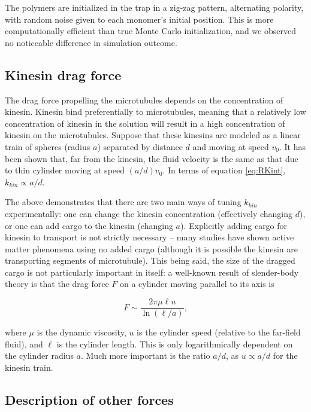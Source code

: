 \documentclass[11pt]{ucthesis}
\begin{document}
The polymers are initialized in the trap in a zig-zag pattern, alternating polarity, with random noise given to each monomer's initial position. This is more computationally efficient than true Monte Carlo initialization, and we observed no noticeable difference in simulation outcome.

\subsection{Kinesin drag force}

The drag force propelling the microtubules depends on the concentration of kinesin. Kinesin bind preferentially to microtubules, meaning that a relatively low concentration of kinesin in the solution will result in a high concentration of kinesin on the microtubules. Suppose that these kinesins are modeled as a linear train of spheres (radius $a$) separated by distance $d$ and moving at speed $v_0$. It has been shown \cite{Monteith2016} that, far from the kinesin, the fluid velocity is the same as that due to thin cylinder moving at speed $(a/d)v_0$. In terms of equation \ref{eq:RKint}, $k_{kin}\propto a/d$.

The above demonstrates that there are two main ways of tuning $k_{kin}$ experimentally: one can change the kinesin concentration (effectively changing $d$), or one can add cargo to the kinesin (changing $a$). Explicitly adding cargo for kinesin to transport is not strictly necessary -- many studies have shown active matter phenomena using no added cargo (although it is possible the kinesin are transporting segments of microtubule). This being said, the size of the dragged cargo is not particularly important in itself: a well-known result of slender-body theory is that the drag force $F$ on a cylinder moving parallel to its axis is

\begin{equation}
F \sim \frac{2\pi \mu \ell u}{\ln(\ell/a)},
\end{equation}

where $\mu$ is the dynamic viscosity, $u$ is the cylinder speed (relative to the far-field fluid), and $\ell$ is the cylinder length. This is only logarithmically dependent on the cylinder radius $a$. Much more important is the ratio $a/d$, as $u\propto a/d$ for the kinesin train.

\subsection{Description of other forces}
\end{document}
